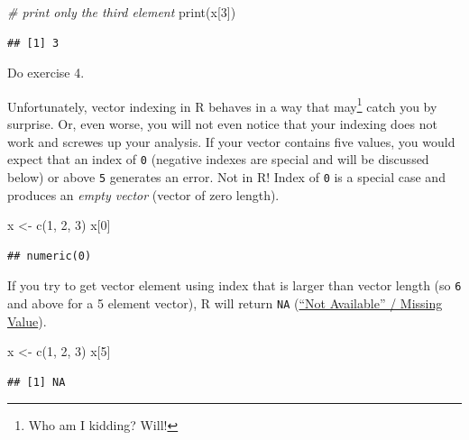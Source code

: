 \documentclass[
]{book}
\newenvironment{Shaded}{\begin{snugshade}}{\end{snugshade}}
\newcommand{\CommentTok}[1]{\textcolor[rgb]{0.56,0.35,0.01}{\textit{#1}}}
\newcommand{\DecValTok}[1]{\textcolor[rgb]{0.00,0.00,0.81}{#1}}
\newcommand{\FunctionTok}[1]{\textcolor[rgb]{0.00,0.00,0.00}{#1}}
\newcommand{\NormalTok}[1]{#1}
\newcommand{\OtherTok}[1]{\textcolor[rgb]{0.56,0.35,0.01}{#1}}
\begin{document}
\begin{Shaded}
\begin{Highlighting}[]
\CommentTok{\# print only the third element}
\FunctionTok{print}\NormalTok{(x[}\DecValTok{3}\NormalTok{])}
\end{Highlighting}
\end{Shaded}

\begin{verbatim}
## [1] 3
\end{verbatim}

Do exercise 4.

Unfortunately, vector indexing in R behaves in a way that may\footnote{Who am I kidding? Will!} catch you by surprise. Or, even worse, you will not even notice that your indexing does not work and screwes up your analysis. If your vector contains five values, you would expect that an index of \texttt{0} (negative indexes are special and will be discussed below) or above \texttt{5} generates an error. Not in R! Index of \texttt{0} is a special case and produces an \emph{empty vector} (vector of zero length).

\begin{Shaded}
\begin{Highlighting}[]
\NormalTok{x }\OtherTok{\textless{}{-}} \FunctionTok{c}\NormalTok{(}\DecValTok{1}\NormalTok{, }\DecValTok{2}\NormalTok{, }\DecValTok{3}\NormalTok{)}
\NormalTok{x[}\DecValTok{0}\NormalTok{]}
\end{Highlighting}
\end{Shaded}

\begin{verbatim}
## numeric(0)
\end{verbatim}

If you try to get vector element using index that is larger than vector length (so \texttt{6} and above for a 5 element vector), R will return \texttt{NA} (\href{https://stat.ethz.ch/R-manual/R-devel/library/base/html/NA.html}{``Not Available'' / Missing Value}).

\begin{Shaded}
\begin{Highlighting}[]
\NormalTok{x }\OtherTok{\textless{}{-}} \FunctionTok{c}\NormalTok{(}\DecValTok{1}\NormalTok{, }\DecValTok{2}\NormalTok{, }\DecValTok{3}\NormalTok{)}
\NormalTok{x[}\DecValTok{5}\NormalTok{]}
\end{Highlighting}
\end{Shaded}

\begin{verbatim}
## [1] NA
\end{verbatim}
\end{document}

